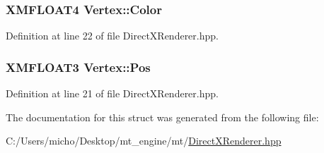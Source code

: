 \subsubsection[{\texorpdfstring{Color}{Color}}]{\setlength{\rightskip}{0pt plus 5cm}X\+M\+F\+L\+O\+A\+T4 Vertex\+::\+Color}\hypertarget{struct_vertex_a18d71d2fe13d3e9239fba3a89e194a1f_a18d71d2fe13d3e9239fba3a89e194a1f}{}\label{struct_vertex_a18d71d2fe13d3e9239fba3a89e194a1f_a18d71d2fe13d3e9239fba3a89e194a1f}


Definition at line 22 of file Direct\+X\+Renderer.\+hpp.

\subsubsection[{\texorpdfstring{Pos}{Pos}}]{\setlength{\rightskip}{0pt plus 5cm}X\+M\+F\+L\+O\+A\+T3 Vertex\+::\+Pos}\hypertarget{struct_vertex_aaf88f17802e68e25a6ecca0ecb2b2795_aaf88f17802e68e25a6ecca0ecb2b2795}{}\label{struct_vertex_aaf88f17802e68e25a6ecca0ecb2b2795_aaf88f17802e68e25a6ecca0ecb2b2795}


Definition at line 21 of file Direct\+X\+Renderer.\+hpp.



The documentation for this struct was generated from the following file\+:\begin{DoxyCompactItemize}
\item 
C\+:/\+Users/micho/\+Desktop/mt\+\_\+engine/mt/\hyperlink{_direct_x_renderer_8hpp}{Direct\+X\+Renderer.\+hpp}\end{DoxyCompactItemize}
